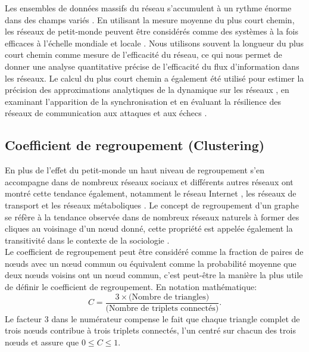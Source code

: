    Les ensembles de données massifs du réseau s'accumulent à un rythme énorme dans des champs variés \cite{Qi-al2010}. En utilisant la mesure moyenne du plus court chemin, les réseaux de petit-monde peuvent être considérés comme des systèmes à la fois efficaces à l'échelle mondiale et locale \cite{Latora-Marchiori2001}. Nous utilisons souvent la longueur du plus court chemin comme mesure de l'efficacité du réseau, ce qui nous permet de donner une analyse quantitative précise de l'efficacité du flux d'information dans les réseaux. Le calcul du plus court chemin a également été utilisé pour estimer la précision des approximations analytiques de la dynamique sur les réseaux \cite{Melnik-al2011}, en examinant l'apparition de la synchronisation \cite{Zhao-al2006} et en évaluant la résilience des réseaux de communication aux attaques et aux échecs \cite{Albert-al2000}.
   
   \subsection{Coefficient de regroupement (Clustering)}
   En plus de l'effet du petit-monde un haut niveau de regroupement s'en accompagne dans de nombreux
   réseaux sociaux et différents autres réseaux ont montré cette tendance également, notamment le réseau Internet \cite{Lad1999}, les réseaux de transport \cite{Seb-al2022} et les réseaux métaboliques \cite{WD2000,SC2001}.
   Le concept de regroupement d'un graphe
   se réfère à la tendance observée dans de nombreux réseaux naturels à former des cliques au voisinage d'un nœud donné, 
   cette propriété est appelée également la transitivité dans le contexte de la sociologie \cite{Wa1994}.\\
   Le coefficient de regroupement peut être considéré comme la fraction de paires de nœuds avec un nœud commun
   ou équivalent comme la probabilité moyenne que deux nœuds voisins ont un nœud commun, c'est peut-\^{e}tre la manière
   la plus utile de définir le coefficient de regroupement. En notation mathématique:
    \begin{equation}
    C=\frac{3\times\text{(Nombre de triangles)}}{\text{(Nombre de triplets connectés)}}
    \label{Clustering}.
   \end{equation}
   Le facteur $3$ dans le numérateur compense le fait que chaque triangle complet de trois nœuds contribue à trois triplets
   connectés, l'un centré sur chacun des trois nœuds et assure que $0\leq C\leq 1$.
 
